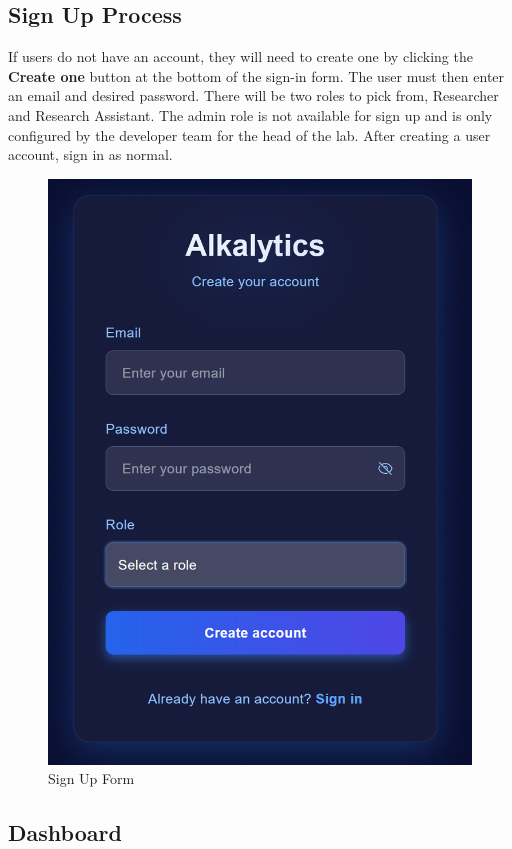 \documentclass[12pt]{article}
\begin{document}
\subsection{Sign Up Process}
If users do not have an account, they will need to create one by clicking the
\textbf{Create one} button at the bottom of the sign-in form. The user must then
enter an email and desired password. There will be two roles to pick from,
Researcher and Research Assistant. The admin role is not available for sign up
and is only configured by the developer team for the head of the lab. After
creating a user account, sign in as normal. 
\begin{figure}[H]
    \centering
    \includegraphics[scale=0.55]{./Diagrams/sign up .png}
    \caption{Sign Up Form}
    \label{fig:signup}
\end{figure}

\subsection{Dashboard}
\end{document}
